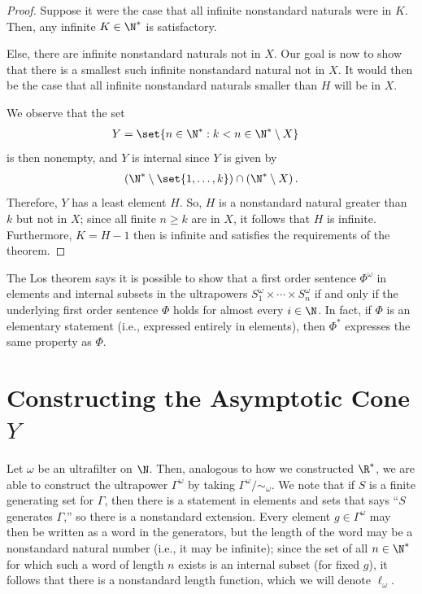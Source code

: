 \documentclass[10pt]{mypackage}
\begin{document}
\begin{proof}
  Suppose it were the case that all infinite nonstandard naturals were in $K$. Then, any infinite $K\in \N^{\ast}$ is satisfactory.

  Else, there are infinite nonstandard naturals not in $X$. Our goal is now to show that there is a smallest such infinite nonstandard natural not in $X$. It would then be the case that all infinite nonstandard naturals smaller than $H$ will be in $X$.

  We observe that the set
  \begin{align*}
    Y &= \set{n\in \N^{\ast} : k < n\in \N^{\ast}\setminus X}
  \end{align*}
  is then nonempty, and $Y$ is internal since $Y$ is given by
  \begin{align*}
    \left( \N^{\ast}\setminus \set{1,\dots,k} \right)\cap \left( \N^{\ast}\setminus X \right).
  \end{align*}
  Therefore, $Y$ has a least element $H$. So, $H$ is a nonstandard natural greater than $k$ but not in $X$; since all finite $n\geq k$ are in $X$, it follows that $H$ is infinite. Furthermore, $K = H-1$ then is infinite and satisfies the requirements of the theorem.
\end{proof}
The Los theorem says it is possible to show that a first order sentence $\Phi^{\omega}$ in elements and internal subsets in the ultrapowers $S_1^{\omega}\times\cdots\times S_n^{\omega}$ if and only if the underlying first order sentence $\Phi$ holds for almost every $i\in \N$. In fact, if $\Phi$ is an elementary statement (i.e., expressed entirely in elements), then $\Phi^{\ast}$ expresses the same property as $\Phi$.
\section{Constructing the Asymptotic Cone $Y$}%
Let $\omega$ be an ultrafilter on $\N$. Then, analogous to how we constructed $\R^{\ast}$, we are able to construct the ultrapower $\Gamma^{\omega}$ by taking $\Gamma^{\omega}/\sim_{\omega}$. We note that if $S$ is a finite generating set for $\Gamma$, then there is a statement in elements and sets that says ``$S$ generates $\Gamma$,'' so there is a nonstandard extension. Every element $g\in \Gamma^{\omega}$ may then be written as a word in the generators, but the length of the word may be a nonstandard natural number (i.e., it may be infinite); since the set of all $n\in \N^{\ast}$ for which such a word of length $n$ exists is an internal subset (for fixed $g$), it follows that there is a nonstandard length function, which we will denote $\ell_{\omega}$.
\end{document}
